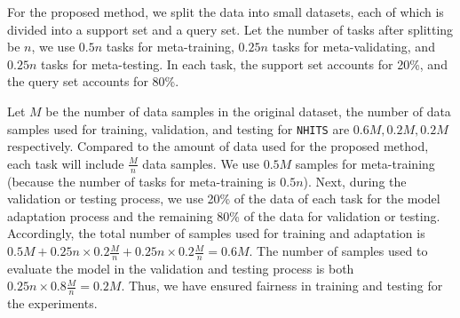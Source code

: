 \documentclass[aps,prb,groupedaddress,twocolumn,showpacs,dvipdfmx,superscriptaddress,pdftex]{revtex4-2}
\begin{document}
\vspace{2mm}


For the proposed method, we split the data into small datasets, each of which is divided into a support set and a query set. Let the number of tasks after splitting be $n$, we use $0.5n$ tasks for meta-training, $0.25n$ tasks for meta-validating, and $0.25n$ tasks for meta-testing. In each task, the support set accounts for 20\%, and the query set accounts for 80\%.

\vspace{2mm}


Let $M$ be the number of data samples in the original dataset, the number of data samples used for training, validation, and testing for \verb|NHITS| are $0.6M, 0.2M, 0.2M$ respectively. Compared to the amount of data used for the proposed method, each task will include $\frac{M}{n}$ data samples. We use $0.5M$ samples for meta-training (because the number of tasks for meta-training is $0.5n$). Next, during the validation or testing process, we use 20\% of the data of each task for the model adaptation process and the remaining 80\% of the data for validation or testing. Accordingly, the total number of samples used for training and adaptation is $0.5M + 0.25n \times 0.2\frac{M}{n} + 0.25n \times 0.2\frac{M}{n} = 0.6M$. The number of samples used to evaluate the model in the validation and testing process is both $0.25n \times 0.8\frac{M}{n} = 0.2M$. Thus, we have ensured fairness in training and testing for the experiments.
\end{document}
